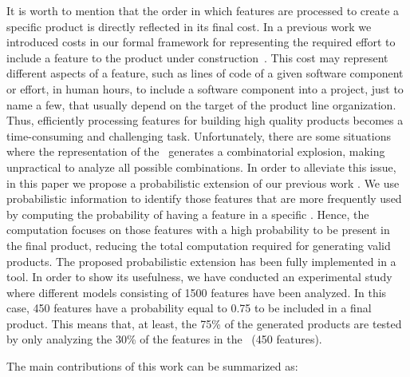 It is worth to mention that the order in which features are processed to create a specific product is directly reflected in its final cost. In a previous work we introduced costs in our formal framework for representing the required effort to include a feature to the product under construction~\cite{clc16}. This cost may represent different aspects of a feature, such as lines of code of a given software component or effort, in human hours, to include a software component into a project, just to name a few, that usually depend on the target of the product line organization. Thus, efficiently processing features for building high quality products becomes a time-consuming and challenging task. Unfortunately, there are some situations where the representation of the \SPL\ generates a combinatorial explosion, making unpractical to analyze all possible combinations.
%
In order to alleviate this issue, in this paper we propose a probabilistic extension of our previous work \fodaPA. We use probabilistic information to identify those features that are more frequently used by computing the probability of having a feature in a specific \SPL. Hence, the computation focuses on those features with a high probability to be present in the final product, reducing the total computation required for generating valid products. The proposed probabilistic extension has been fully implemented in a tool. In order to show its usefulness, we have conducted an experimental study where different models consisting of 1500 features have been analyzed. In this case, 450 features have a probability equal to 0.75 to be included in a final product. This means that, at least, the 75\% of the generated products are tested by only analyzing the 30\% of the features in the \SPL\ (450 features).

The main contributions of this work can be summarized as:


